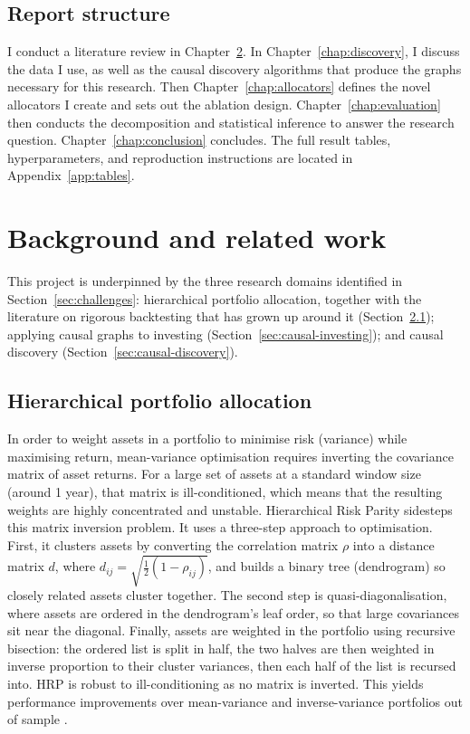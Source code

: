 \documentclass[11pt, a4paper]{report}
\begin{document}
\section{Report structure}
\label{sec:structure}

I conduct a literature review in Chapter~\ref{chap:background}. 
In Chapter~\ref{chap:discovery}, I discuss the data I use, as well as the causal discovery algorithms that produce the graphs necessary for this research.
Then Chapter~\ref{chap:allocators} defines the novel allocators I create and sets out the ablation design.
Chapter~\ref{chap:evaluation} then conducts the decomposition and statistical inference to answer the research question.
Chapter~\ref{chap:conclusion} concludes.
The full result tables, hyperparameters, and reproduction instructions are located in Appendix~\ref{app:tables}.

\chapter{Background and related work}
\label{chap:background}

This project is underpinned by the three research domains identified in Section~\ref{sec:challenges}: hierarchical portfolio allocation, together with the literature on rigorous backtesting that has grown up around it (Section~\ref{sec:hierarchical-allocation}); applying causal graphs to investing (Section~\ref{sec:causal-investing}); and causal discovery (Section~\ref{sec:causal-discovery}). 

\section{Hierarchical portfolio allocation}
\label{sec:hierarchical-allocation}

In order to weight assets in a portfolio to minimise risk (variance) while maximising return, mean-variance optimisation \cite{markowitz1952portfolio} requires inverting the covariance matrix of asset returns.
For a large set of assets at a standard window size (around 1 year), that matrix is ill-conditioned, which means that the resulting weights are highly concentrated and unstable.
Hierarchical Risk Parity \cite{lopezdeprado2016hrp} sidesteps this matrix inversion problem. It uses a three-step approach to optimisation. First, it clusters assets by converting the
correlation matrix $\rho$ into a distance matrix $d$, where $d_{ij} = \sqrt{\tfrac{1}{2}(1-\rho_{ij})}$, and builds a binary tree (dendrogram) so closely related assets cluster together.
The second step is quasi-diagonalisation, where assets are ordered in the dendrogram's leaf order, so that large covariances sit near the diagonal.
Finally, assets are weighted in the portfolio using recursive bisection: the ordered list is split in half, the two halves are then weighted in inverse proportion to their cluster variances,
then each half of the list is recursed into. 
HRP is robust to ill-conditioning as no matrix is inverted.
This yields performance improvements over mean-variance and inverse-variance portfolios out of sample \cite{lopezdeprado2016hrp}.
\end{document}

